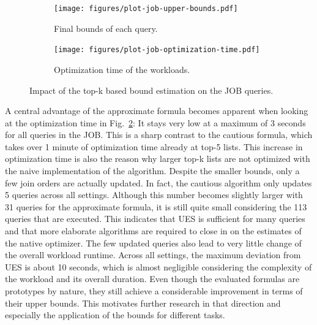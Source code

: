 \begin{figure}[tb]
	\centering
	\begin{subfigure}[b]{0.47\textwidth}
	    \centering
	    \texttt{[image: figures/plot-job-upper-bounds.pdf]}
	    \caption{Final bounds of each query.}
	    \label{fig:results-topk-upper-bounds}
	\end{subfigure}
	\begin{subfigure}[b]{0.47\textwidth}
	    \centering
	    \texttt{[image: figures/plot-job-optimization-time.pdf]}
	    \caption{Optimization time of the workloads.}
	    \label{fig:results-topk-optimization-time}
	\end{subfigure}
	\caption{Impact of the top-k based bound estimation on the JOB queries.}
	\label{fig:results-topk}
\end{figure}

A central advantage of the approximate formula becomes apparent when looking at the optimization time in Fig.~\ref{fig:results-topk-optimization-time}: It stays very low at a maximum of 3 seconds for all queries in the JOB.
This is a sharp contrast to the cautious formula, which takes over 1 minute of optimization time already at top-5 lists.
This increase in optimization time is also the reason why larger top-k lists are not optimized with the naive implementation of the algorithm.
Despite the smaller bounds, only a few join orders are actually updated.
In fact, the cautious algorithm only updates 5 queries across all settings.
Although this number becomes slightly larger with 31 queries for the approximate formula, it is still quite small considering the 113 queries that are executed.
This indicates that UES is sufficient for many queries and that more elaborate algorithms are required to close in on the estimates of the native optimizer.
The few updated queries also lead to very little change of the overall workload runtime.
Across all settings, the maximum deviation from UES is about 10 seconds, which is almost negligible considering the complexity of the workload and its overall duration.
Even though the evaluated formulas are prototypes by nature, they still achieve a considerable improvement in terms of their upper bounds.
This motivates further research in that direction and especially the application of the bounds for different tasks.


